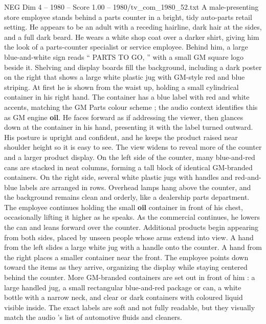 \begin{textsample}{NEG Dim 4 – 1980 – Score 1.00 – 1980/tv\_com\_1980\_52.txt}  \label{ex:f4_neg_059}
A male-presenting store employee stands behind a parts counter in a bright, tidy auto-parts retail setting.
He appears to be an adult with a receding hairline, dark hair at the sides, and a full dark beard.
He wears a white shop coat over a darker shirt, giving him the look of a parts-counter specialist or service employee.
Behind him, a large blue-and-white sign reads “ PARTS TO GO, ” with a small GM square logo beside it.
Shelving and display boards fill the background, including a dark poster on the right that shows a large white plastic jug with GM-style red and blue striping.
At first he is shown from the waist up, holding a small cylindrical container in his right hand.
The container has a blue label with red and white accents, matching the GM Parts colour scheme ; the audio context identifies this as GM engine \textbf{oil}.
He faces forward as if addressing the viewer, then glances down at the container in his hand, presenting it with the label turned outward.
His posture is upright and confident, and he keeps the product raised near shoulder height so it is easy to see.
The view widens to reveal more of the counter and a larger product display.
On the left side of the counter, many blue-and-red cans are stacked in neat columns, forming a tall block of identical GM-branded containers.
On the right side, several white plastic jugs with handles and red-and-blue labels are arranged in rows.
Overhead lamps hang above the counter, and the background remains clean and orderly, like a dealership parts department.
The employee continues holding the small \textbf{oil} container in front of his chest, occasionally lifting it higher as he speaks.
As the commercial continues, he lowers the can and leans forward over the counter.
Additional products begin appearing from both sides, placed by unseen people whose arms extend into view.
A hand from the left slides a large white jug with a handle onto the counter.
A hand from the right places a smaller container near the front.
The employee points down toward the items as they arrive, organizing the display while staying centered behind the counter.
More GM-branded containers are set out in front of him : a large handled jug, a small rectangular blue-and-red package or can, a white bottle with a narrow neck, and clear or dark containers with coloured liquid visible inside.
The exact labels are soft and not fully readable, but they visually match the audio ’s list of automotive fluids and cleaners.

\end{textsample}
